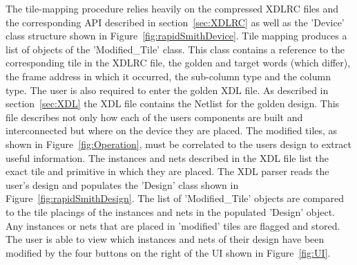 The tile-mapping procedure relies heavily on the compressed XDLRC files and the corresponding \acrshort{API} described in section~\ref{sec:XDLRC} as well as the 'Device' class structure shown in Figure~\ref{fig:rapidSmithDevice}.
Tile mapping produces a list of objects of the 'Modified\_Tile' class.
This class contains a reference to the corresponding tile in the XDLRC file, the \gls{golden} and \gls{target} words (which differ), the frame address in which it occurred, the sub-column type and the column type.
The user is also required to enter the \gls{golden} \acrshort{XDL} file.
As described in section~\ref{sec:XDL} the \acrshort{XDL} file contains the Netlist for the \gls{golden} design.
This file describes not only how each of the users components are built and interconnected but where on the device they are placed.
The modified tiles, as shown in Figure~\ref{fig:Operation}, must be correlated to the users design to extract useful information.
The instances and nets described in the \acrshort{XDL} file list the exact tile and primitive in which they are placed.
The \RapidSmith \acrshort{XDL} parser reads the user's design and populates the 'Design' class shown in Figure~\ref{fig:rapidSmithDesign}.
The list of 'Modified\_Tile' objects are compared to the tile placings of the instances and nets in the populated 'Design' object.
Any instances or nets that are placed in 'modified' tiles are flagged and stored.
The user is able to view which instances and nets of their design have been modified by the four buttons on the right of the \acrshort{UI} shown in Figure~\ref{fig:UI}.


